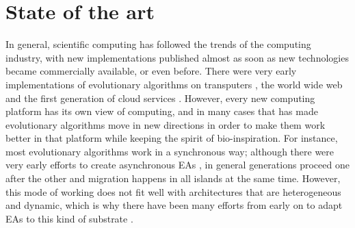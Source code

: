 \documentclass{llncs}
\begin{document}
  \section{State of the art}

  In general, scientific computing has followed the trends of the
  computing industry, with new implementations published almost as soon
  as new technologies became commercially available, or even
  before. There were very early implementations of evolutionary
  algorithms on transputers \cite{voigt1990modelling}, the world wide
  web \cite{chong:1999:jDGPi} and the first generation of cloud
  services
  \cite{DBLP:journals/corr/abs-1105-6205,de2017parallel,salza2017ccube}. %
  However, every new computing platform has its own view of computing, and in many cases that has made evolutionary algorithms move in new directions in order to make them work better in that platform while keeping the spirit of
  bio-inspiration. For instance, most evolutionary algorithms work in a
  synchronous way; although there were very early efforts to create
  asynchronous EAs \cite{coleman89}, in general
  generations proceed one after the other and migration happens in
  all islands at the same time. However, this mode of working does not
  fit well with architectures that are heterogeneous and dynamic, which
  is why there have been many efforts from early
  on to adapt EAs to this kind of substrate
  \cite{Jini:FEA2000,zorman2002creation,baugh2003asynchronous}.
\end{document}
